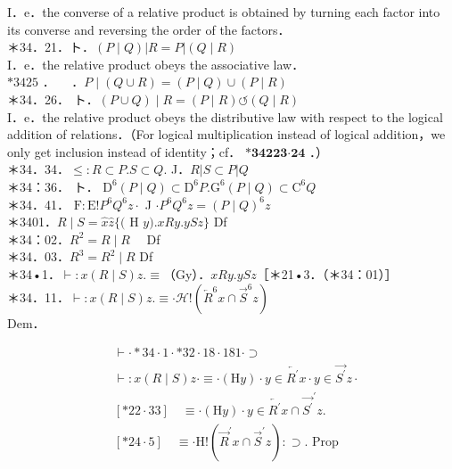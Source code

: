 \documentclass[10pt]{article}
\begin{document}
I．e．the converse of a relative product is obtained by turning each factor into its converse and reversing the order of the factors．\\
＊34．21．ト．$(P \mid Q)|R=P|(Q \mid R)$\\
I．e．the relative product obeys the associative law．\\
$* 3425$ ．$\quad$ ．$P \mid(Q \cup R)=(P \mid Q) \cup(P \mid R)$\\
＊34．26． ト．$(P \cup Q) \mid R=(P \mid R) \circlearrowleft(Q \mid R)$\\
I．e．the relative product obeys the distributive law with respect to the logical addition of relations．（For logical multiplication instead of logical addition，we only get inclusion instead of identity；cf． $\boldsymbol{*} \mathbf{3 4} \boldsymbol{2} \mathbf{2 3} \boldsymbol{\cdot} \mathbf{2 4}$ ．）\\
＊34．34．$\leqslant: R \subset P . S \subset Q$. J．$R|S \subset P| Q$\\
＊34：36． ト． $\mathrm{D}^{6}(P \mid Q) \subset \mathrm{D}^{6} P . \mathrm{G}^{6}(P \mid Q) \subset \mathrm{C}^{6} Q$\\
＊34．41． $\mathrm{F}: \mathrm{E}!P^{6} Q^{6} z \cdot$ J $\cdot P^{6} Q^{6} z=(P \mid Q)^{6} z$\\
＊3401．$R \mid S=\widehat{x} \widehat{z}\{($ H $y) . x R y . y S z\}$ Df\\
＊34：02．$R^{2}=R \mid R \quad$ Df\\
＊34．03．$R^{3}=R^{2} \mid R$ Df\\
＊34•1．$\vdash: x(R \mid S) z . \equiv$（Gy）．$x R y . y S z$［＊21•3．（＊34：01）］\\
＊34．11．$\vdash: x(R \mid S) z . \equiv \cdot \mathcal{H}!\left(\overleftarrow{R}^{6} x \cap \vec{S}^{6} z\right)$\\
Dem．

$$
\begin{aligned}
& \vdash \cdot * 34 \cdot 1 \cdot * 32 \cdot 18 \cdot 181 \cdot \supset \\
& \vdash: x(R \mid S) z \cdot \equiv \cdot(\mathrm{H} y) \cdot y \in \overleftarrow{R^{\prime}} x \cdot y \in \overrightarrow{S^{\prime}} z \cdot \\
& {[* 22 \cdot 33] \quad \equiv \cdot(\mathrm{H} y) \cdot y \in \overleftarrow{R^{\prime}} x \cap{\overrightarrow{S^{\prime}}}^{\prime} z .} \\
& {[* 24 \cdot 5] \quad \equiv \cdot \mathrm{H}!\left(\vec{R}^{\prime} x \cap \vec{S}^{\prime} z\right): \supset \text {. Prop }}
\end{aligned}
$$
\end{document}
